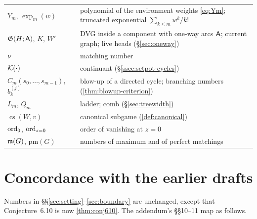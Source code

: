 \begin{center}
\begin{longtable}{@{}L{0.25}L{0.71}@{}}
$Y_m$, $\exp_m(w)$ & polynomial of the environment weights \eqref{eq:Ym}; truncated exponential $\sum_{k\le m}w^k/k!$\\
$\mathfrak{G}(H;\mathsf{A})$, $K$, $W'$ & DVG inside a component with one-way arcs $\mathsf{A}$; current graph; live heads (\S\ref{sec:oneway})\\
$\nu$ & matching number\\
$\mathcal{K}(\cdot)$ & continuant (\S\ref{ssec:setpot-cycles})\\
$C_m(s_0,\dots,s_{m-1})$, $b^{(j)}_k$ & blow-up of a directed cycle; branching numbers (\cref{thm:blowup-criterion})\\
$L_m$, $Q_m$ & ladder; comb (\S\ref{sec:treewidth})\\
$\operatorname{cs}(W,v)$ & canonical subgame (\cref{def:canonical})\\
$\operatorname{ord}_0$, $\operatorname{ord}_{z=0}$ & order of vanishing at $z=0$\\
$\mathfrak{m}(G)$, $\mathrm{pm}(G)$ & numbers of maximum and of perfect matchings\\
\bottomrule
\end{longtable}
\end{center}

\section{Concordance with the earlier drafts}\label{app:concordance}

Numbers in \S\S\ref{sec:setting}--\ref{sec:boundary} are unchanged, except that Conjecture~6.10 is now \cref{thm:conj610}. The addendum's \S\S10--11 map as follows.

